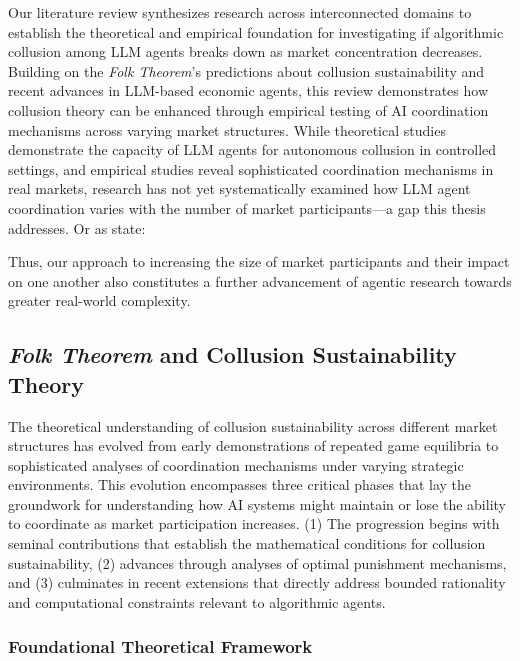 Our literature review synthesizes research across interconnected domains to establish the theoretical and empirical foundation for investigating if algorithmic collusion among LLM agents breaks down as market concentration decreases. Building on the \emph{Folk Theorem}'s predictions about collusion sustainability and recent advances in LLM-based economic agents, this review demonstrates how collusion theory can be enhanced through empirical testing of AI coordination mechanisms across varying market structures. While theoretical studies demonstrate the capacity of LLM agents for autonomous collusion in controlled settings, and empirical studies reveal sophisticated coordination mechanisms in real markets, research has not yet systematically examined how LLM agent coordination varies with the number of market participants---a gap this thesis addresses. Or as \textcite[p.24]{fish_algorithmic_2025} state:
\begin{displayquote}
\end{displayquote}

Thus, our approach to increasing the size of market participants and their impact on one another also constitutes a further advancement of agentic research towards greater real-world complexity.

\subsection{\emph{Folk Theorem} and Collusion Sustainability Theory}

The theoretical understanding of collusion sustainability across different market structures has evolved from early demonstrations of repeated game equilibria to sophisticated analyses of coordination mechanisms under varying strategic environments. This evolution encompasses three critical phases that lay the groundwork for understanding how AI systems might maintain or lose the ability to coordinate as market participation increases. (1) The progression begins with seminal contributions that establish the mathematical conditions for collusion sustainability, (2) advances through analyses of optimal punishment mechanisms, and (3) culminates in recent extensions that directly address bounded rationality and computational constraints relevant to algorithmic agents.

\subsubsection*{Foundational Theoretical Framework}

